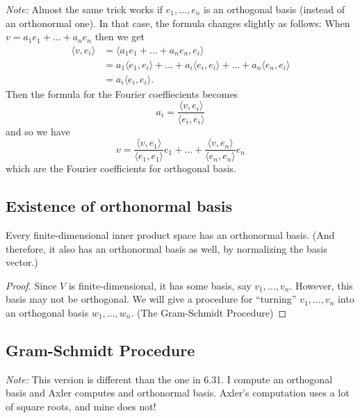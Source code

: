 \documentclass[11pt]{article}
\begin{document}
    \vspace{1em}

    \emph{Note:} Almost the same trick works if \(e_1, \dots, e_n\) is an orthogonal basis (instead of an orthonormal one). In that case, the formula changes slightly as follows: When \(v = a_1 e_1 + \dots + a_n e_n\) then we get 
    \begin{align*}
        \langle v, e_i \rangle &= \langle a_1 e_1 + \dots + a_n e_n, e_i \rangle \\
                               &= a_1 \langle e_1, e_i \rangle + \dots + a_i \langle e_i, e_i \rangle + \dots + a_n \langle e_n, e_i \rangle \\
                               &= a_i \langle e_i, e_i \rangle.
    \end{align*}
    Then the formula for the Fourier coeffiecients becomes \[a_i = \frac{\langle v, e_i \rangle}{\langle e_i, e_i \rangle}\] and so we have \[v = \frac{\langle v, e_1 \rangle}{\langle e_1, e_1 \rangle} e_1 + \dots + \frac{\langle v, e_n \rangle}{\langle e_n, e_n \rangle} e_n\] which are the Fourier coefficients for orthogonal basis. 

    \subsection{Existence of orthonormal basis}

    Every finite-dimensional inner product space has an orthonormal basis. (And therefore, it also has an orthonormal basis as well, by normalizing the basis vector.)

    \begin{proof}
        Since $V$ is finite-dimensional, it has some basis, say \(v_1, \dots, v_n\). However, this basis may not be orthogonal. We will give a procedure for ``turning'' \(v_1, \dots, v_n\) into an orthogonal basis \(w_1, \dots, w_n\). (The Gram-Schmidt Procedure)
    \end{proof}

    \subsection{Gram-Schmidt Procedure}

    \emph{Note:} This version is different than the one in 6.31. I compute an orthogonal basis and Axler computes and orthonormal basis. Axler's computation uses a lot of square roots, and mine does not!

    \vspace{1em}
\end{document}
